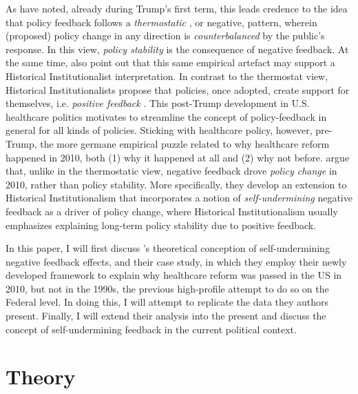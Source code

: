 \documentclass[11pt]{article}
\begin{document}
\noindent As \textcite[][]{Busemeyer2019} have noted, already during Trump's first term, this leads credence to the idea that policy feedback follows a \textit{thermostatic} \parencite[][]{Wlezien1995}, or negative, pattern, wherein (proposed) policy change in any direction is \textit{counterbalanced} by the public's response. In this view, \textit{policy stability} is the consequence of negative feedback. At the same time, \textcite[][]{Busemeyer2019} also point out that this same empirical artefact may support a Historical Institutionalist interpretation. In contrast to the thermostat view, Historical Institutionalists propose that policies, once adopted, create support for themselves, i.e. \textit{positive feedback} \parencites[see e.g.][]{Pierson1993}{Pierson2000}. This post-Trump development in U.S. healthcare politics motivates \textcite[][]{Busemeyer2019} to streamline the concept of policy-feedback in general for all kinds of policies. Sticking with healthcare policy, however, pre-Trump, the more germane empirical puzzle related to why healthcare reform happened in 2010, both (1) why it happened at all and (2) why not before. \textcite[][]{Jacobs2014} argue that, unlike in the thermostatic view, negative feedback drove \textit{policy change} in 2010, rather than policy stability. More specifically, they develop an extension to Historical Institutionalism that incorporates a notion of \textit{self-undermining} negative feedback as a driver of policy change, where Historical Institutionalism usually emphasizes explaining long-term policy stability due to positive feedback.

In this paper, I will first discuss \citeauthor[][]{Jacobs2014}'s \parencite*{Jacobs2014} theoretical conception of self-undermining negative feedback effects, and their case study, in which they employ their newly developed framework to explain why healthcare reform was passed in the US in 2010, but not in the 1990s, the previous high-profile attempt to do so on the Federal level. In doing this, I will attempt to replicate the data they authors present. Finally, I will extend their analysis into the present and discuss the concept of self-undermining feedback in the current political context.

\section*{Theory}
\end{document}
